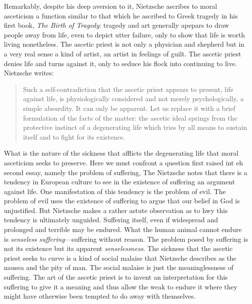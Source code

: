 Remarkably, despite his deep aversion to it, Nietzsche ascribes to moral asceticism a function similar to that which he ascribed to Greek tragedy in his first book, \emph{The Birth of Tragedy}: tragedy and art generally apepars to draw people away from life, even to depict utter failure, only to show that life is worth living nonetheless. The ascetic priest is not only a physician and shepherd but in a very real sense a kind of artist, an artist in feelings of guilt. The ascetic priest denies life and turns against it, only to seduce his flock into continuing to live. Nietzsche writes:
\begin{quote}
    Such a self-contradiction that the ascetic priest appears to present, life against life, is physiologically considered and not merely psychologically, a simple absurdity. It can only be apparent. Let us replace it with a brief formulation of the facts of the matter: the ascetic ideal springs from the protective instinct of a degenerating life which tries by all means to sustain itself and to fight for its existence.
\end{quote}

What is the nature of the sickness that afflicts the degenerating life that moral asceticism seeks to preserve. Here we must confront a question first raised int eh second essay, namely the problem of suffering, The Nietzsche notes that there is a tendency in European culture to see in the existence of suffering an argument against life. One manifestation of this tendency is the problem of evil. The problem of evil uses the existence of suffering to argue that our belief in God is unjustified. But Nietzsche makes a rather astute observation as to hwy this tendency is ultimately unguided. Suffering itself, even if widespread and prolonged and terrible may be endured. What the human animal cannot endure is \emph{senseless suffering}---suffering without reason. The problem posed by suffering is not its existence but its apparent \emph{senselessness}. The sickness that the ascetic priest seeks to curve is a kind of social malaise that Nietzsche describes as the nausea and the pity of man. The social malaise is just the meaninglessness of suffering. The art of the ascetic priest is to invent an interpretation for this suffering to give it a meaning and thus allow the weak to endure it where they might have otherwise been tempted to do away with themselves.


